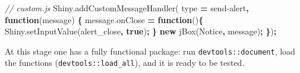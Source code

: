 \documentclass[
]{krantz}
\makeatletter
\newenvironment{Shaded}{\begin{snugshade}}{\end{snugshade}}
\newcommand{\AttributeTok}[1]{\textcolor[rgb]{0.61,0.61,0.61}{#1}}
\newcommand{\CommentTok}[1]{\textcolor[rgb]{0.37,0.37,0.37}{\textit{#1}}}
\newcommand{\ControlFlowTok}[1]{\textcolor[rgb]{0.27,0.27,0.27}{\textbf{#1}}}
\newcommand{\KeywordTok}[1]{\textcolor[rgb]{0.27,0.27,0.27}{\textbf{#1}}}
\newcommand{\NormalTok}[1]{#1}
\newcommand{\OperatorTok}[1]{\textcolor[rgb]{0.43,0.43,0.43}{\textbf{#1}}}
\newcommand{\StringTok}[1]{\textcolor[rgb]{0.5,0.5,0.5}{#1}}
\newcommand{\VariableTok}[1]{\textcolor[rgb]{0,0,0}{#1}}
\newenvironment{kframe}{%
\medskip{}
\setlength{\fboxsep}{.8em}
 \def\at@end@of@kframe{}%
 \ifinner\ifhmode%
  \def\at@end@of@kframe{\end{minipage}}%
  \begin{minipage}{\columnwidth}%
 \fi\fi%
 \def\FrameCommand##1{\hskip\@totalleftmargin \hskip-\fboxsep
 \colorbox{shadecolor}{##1}\hskip-\fboxsep
     \hskip-\linewidth \hskip-\@totalleftmargin \hskip\columnwidth}%
 \MakeFramed {\advance\hsize-\width
   \@totalleftmargin\z@ \linewidth\hsize
   \@setminipage}}%
 {\par\unskip\endMakeFramed%
 \at@end@of@kframe}
\renewenvironment{Shaded}{\begin{kframe}}{\end{kframe}}
\makeatother
\begin{document}
\begin{Shaded}
\begin{Highlighting}[]
\CommentTok{// custom.js}
\VariableTok{Shiny}\NormalTok{.}\AttributeTok{addCustomMessageHandler}\NormalTok{(}
\NormalTok{  type }\OperatorTok{=} \StringTok{\textquotesingle{}send{-}alert\textquotesingle{}}\OperatorTok{,} \KeywordTok{function}\NormalTok{(message) }\OperatorTok{\{}
    \VariableTok{message}\NormalTok{.}\AttributeTok{onClose} \OperatorTok{=} \KeywordTok{function}\NormalTok{()}\OperatorTok{\{}
      \VariableTok{Shiny}\NormalTok{.}\AttributeTok{setInputValue}\NormalTok{(}\StringTok{\textquotesingle{}alert\_close\textquotesingle{}}\OperatorTok{,} \KeywordTok{true}\NormalTok{)}\OperatorTok{;}
    \OperatorTok{\}}
    \KeywordTok{new} \AttributeTok{jBox}\NormalTok{(}\StringTok{\textquotesingle{}Notice\textquotesingle{}}\OperatorTok{,}\NormalTok{ message)}\OperatorTok{;}
\OperatorTok{\}}\NormalTok{)}\OperatorTok{;}
\end{Highlighting}
\end{Shaded}

At this stage one has a fully functional package: run \texttt{devtools::document}, load the functions (\texttt{devtools::load\_all}), and it is ready to be tested.

\begin{Shaded}
\end{Shaded}
\end{document}
